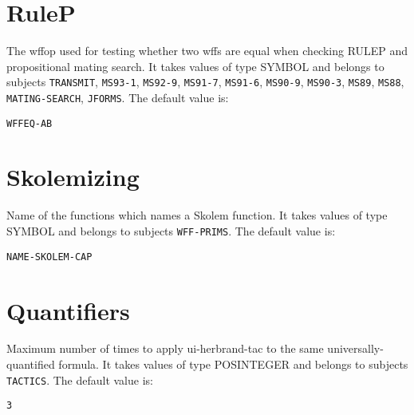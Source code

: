 \section{RuleP}

\begin{description} 
\item[RULEP-WFFEQ]  
The wffop used for testing whether two wffs are equal when checking
RULEP and propositional mating search.
It takes values of type SYMBOL and belongs to subjects \texttt{TRANSMIT}, \texttt{MS93-1}, \texttt{MS92-9}, \texttt{MS91-7}, \texttt{MS91-6}, \texttt{MS90-9}, \texttt{MS90-3}, \texttt{MS89}, \texttt{MS88}, \texttt{MATING-SEARCH}, \texttt{JFORMS}.  The default value is: \begin{lstlisting}
WFFEQ-AB
\end{lstlisting}

\item
\end{description}

\section{Skolemizing}

\begin{description} 
\item[NAME-SKOLEM-FN]  
Name of the functions which names a Skolem function.
It takes values of type SYMBOL and belongs to subjects \texttt{WFF-PRIMS}.  The default value is: \begin{lstlisting}
NAME-SKOLEM-CAP
\end{lstlisting}

\item
\end{description}

\section{Quantifiers}

\begin{description} 
\item[UI-HERBRAND-LIMIT]  
Maximum number of times to apply ui-herbrand-tac to the
same universally-quantified formula.
It takes values of type POSINTEGER and belongs to subjects \texttt{TACTICS}.  The default value is: \begin{lstlisting}
3
\end{lstlisting}

\item
\end{description}

